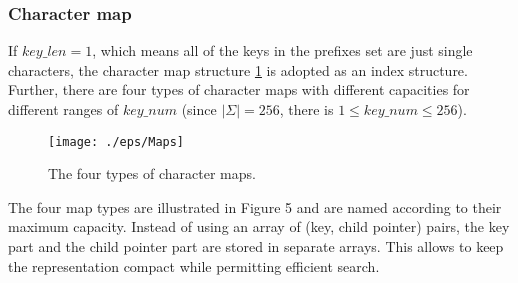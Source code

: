 \documentclass[legalpaper]{article}
\begin{document}
\subsubsection{Character map}

If $key\_len=1$, which means all of the keys in the prefixes set are
just single characters, the \textsf{character map} structure
\ref{fig:character map} is adopted as an index structure. Further,
there are four types of character maps with different capacities for
different ranges of $key\_num$ (since $|\Sigma|=256$, there is $1 \le
key\_num \le 256$).

\begin{figure}[htbp]
  \label{fig:character map}
  \centering
  \texttt{[image: ./eps/Maps]}
  \caption{The four types of character maps.}
\end{figure}

The four map types are illustrated in Figure 5 and are named according
to their maximum capacity. Instead of using an array of (key, child
pointer) pairs, the key part and the child pointer part are stored in
separate arrays. This allows to keep the representation compact while
permitting efficient search.
\end{document}
